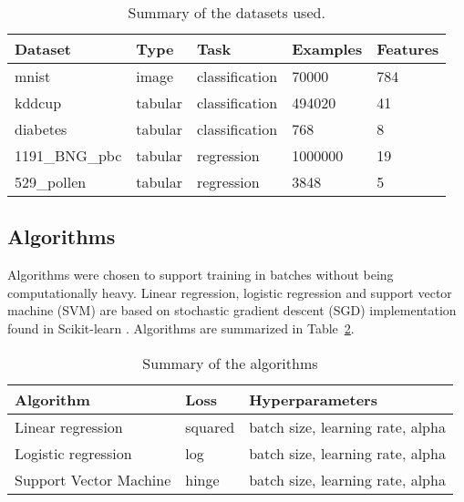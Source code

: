 \begin{table}[h]
    \centering
    \begin{tabular}{lllll}
        \toprule
        Dataset        & Type    & Task           & Examples & Features \\
        \midrule
        mnist          & image   & classification & 70000    & 784      \\
        kddcup         & tabular & classification & 494020   & 41       \\
        diabetes       & tabular & classification & 768      & 8        \\
        1191\_BNG\_pbc & tabular & regression     & 1000000  & 19       \\
        529\_pollen    & tabular & regression     & 3848     & 5        \\
        \bottomrule
    \end{tabular}
    \caption{Summary of the datasets used.}
    \label{table:datasets}
\end{table}


\subsection{Algorithms}

Algorithms were chosen to support training in batches without being computationally heavy. Linear regression, logistic regression and support vector machine (SVM) are based on stochastic gradient descent (SGD) implementation found in Scikit-learn \parencite{pedregosaScikitlearnMachineLearning2011}. Algorithms are summarized in Table~\ref{table:algorithms}.

\begin{table}[h]
    \centering
    \begin{tabular}{lll}
        \toprule
        Algorithm              & Loss    & Hyperparameters                  \\
        \midrule
        Linear regression      & squared & batch size, learning rate, alpha \\
        Logistic regression    & log     & batch size, learning rate, alpha \\
        Support Vector Machine & hinge   & batch size, learning rate, alpha \\
        \bottomrule
    \end{tabular}
    \caption{Summary of the algorithms}
    \label{table:algorithms}
\end{table}

